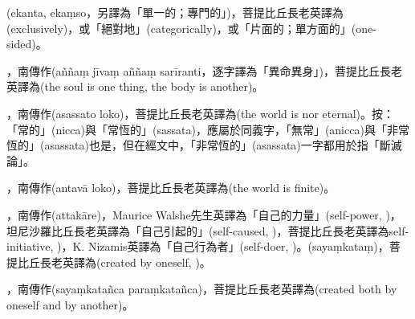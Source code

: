 \startitemgroup[noteitems]
\item{}(ekanta, ekaṃso，另譯為「單一的；專門的」)，菩提比丘長老英譯為(exclusively)，或「絕對地」(categorically)，或「片面的；單方面的」(one-sided)。
\stopitemgroup

\startitemgroup[noteitems]
\item{}，南傳作(aññaṃ jīvaṃ aññaṃ sarīranti，逐字譯為「異命異身」)，菩提比丘長老英譯為(the soul is one thing, the body is another)。
\stopitemgroup

\startitemgroup[noteitems]
\item{}，南傳作(asassato loko)，菩提比丘長老英譯為(the world is nor eternal)。按：「常的」(nicca)與「常恆的」(sassata)，應屬於同義字，「無常」(anicca)與「非常恆的」(asassata)也是，但在經文中，「非常恆的」(asassata)一字都用於指「斷滅論」。
\stopitemgroup

\startitemgroup[noteitems]
\item{}，南傳作(antavā loko)，菩提比丘長老英譯為(the world is finite)。
\stopitemgroup

\startitemgroup[noteitems]
\item{}，南傳作(attakāre)，Maurice Walshe先生英譯為「自己的力量」(self-power, )，坦尼沙羅比丘長老英譯為「自己引起的」(self-caused, )，菩提比丘長老英譯為self-initiative, )，K. Nizamis英譯為「自己行為者」(self-doer, )。(sayaṃkataṃ)，菩提比丘長老英譯為(created by oneself, )。
\item{}，南傳作(sayaṃkatañca paraṃkatañca)，菩提比丘長老英譯為(created both by oneself and by another)。
\stopitemgroup

